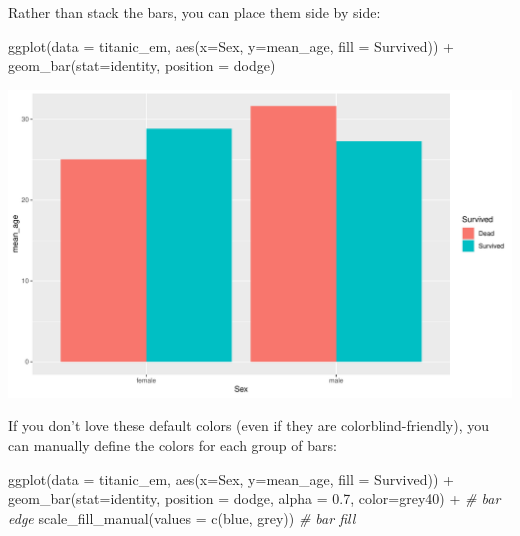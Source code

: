 \documentclass[
]{book}
\newenvironment{Shaded}{\begin{snugshade}}{\end{snugshade}}
\newcommand{\AttributeTok}[1]{\textcolor[rgb]{0.77,0.63,0.00}{#1}}
\newcommand{\CommentTok}[1]{\textcolor[rgb]{0.56,0.35,0.01}{\textit{#1}}}
\newcommand{\FloatTok}[1]{\textcolor[rgb]{0.00,0.00,0.81}{#1}}
\newcommand{\FunctionTok}[1]{\textcolor[rgb]{0.00,0.00,0.00}{#1}}
\newcommand{\NormalTok}[1]{#1}
\newcommand{\SpecialCharTok}[1]{\textcolor[rgb]{0.00,0.00,0.00}{#1}}
\newcommand{\StringTok}[1]{\textcolor[rgb]{0.31,0.60,0.02}{#1}}
\begin{document}
Rather than stack the bars, you can place them side by side:

\begin{Shaded}
\begin{Highlighting}[]
\FunctionTok{ggplot}\NormalTok{(}\AttributeTok{data =}\NormalTok{ titanic\_em, }
       \FunctionTok{aes}\NormalTok{(}\AttributeTok{x=}\NormalTok{Sex, }\AttributeTok{y=}\NormalTok{mean\_age, }\AttributeTok{fill =}\NormalTok{ Survived)) }\SpecialCharTok{+}
  \FunctionTok{geom\_bar}\NormalTok{(}\AttributeTok{stat=}\StringTok{\textquotesingle{}identity\textquotesingle{}}\NormalTok{, }\AttributeTok{position =} \StringTok{\textquotesingle{}dodge\textquotesingle{}}\NormalTok{) }
\end{Highlighting}
\end{Shaded}

\includegraphics{figures/unnamed-chunk-167-1.pdf}

If you don't love these default colors (even if they are colorblind-friendly), you can manually define the colors for each group of bars:

\begin{Shaded}
\begin{Highlighting}[]
\FunctionTok{ggplot}\NormalTok{(}\AttributeTok{data =}\NormalTok{ titanic\_em, }
       \FunctionTok{aes}\NormalTok{(}\AttributeTok{x=}\NormalTok{Sex, }\AttributeTok{y=}\NormalTok{mean\_age, }\AttributeTok{fill =}\NormalTok{ Survived)) }\SpecialCharTok{+}
  \FunctionTok{geom\_bar}\NormalTok{(}\AttributeTok{stat=}\StringTok{\textquotesingle{}identity\textquotesingle{}}\NormalTok{, }
           \AttributeTok{position =} \StringTok{\textquotesingle{}dodge\textquotesingle{}}\NormalTok{, }
           \AttributeTok{alpha =} \FloatTok{0.7}\NormalTok{, }
           \AttributeTok{color=}\StringTok{\textquotesingle{}grey40\textquotesingle{}}\NormalTok{) }\SpecialCharTok{+} \CommentTok{\# bar edge}
  \FunctionTok{scale\_fill\_manual}\NormalTok{(}\AttributeTok{values =} \FunctionTok{c}\NormalTok{(}\StringTok{\textquotesingle{}blue\textquotesingle{}}\NormalTok{, }\StringTok{\textquotesingle{}grey\textquotesingle{}}\NormalTok{)) }\CommentTok{\# bar fill}
\end{Highlighting}
\end{Shaded}
\end{document}
